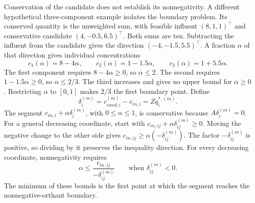 Conservation of the candidate does not establish its nonnegativity. A different hypothetical three-component example isolates the boundary problem. Its conserved quantity is the unweighted sum, with feasible influent $(8,1,1)^\top$ and conservative candidate $(4,-0.5,6.5)^\top$. Both sums are ten. Subtracting the influent from the candidate gives the direction $(-4,-1.5,5.5)^\top$. A fraction $\alpha$ of that direction gives individual concentrations
\[
c_1(\alpha)=8-4\alpha,\qquad
c_2(\alpha)=1-1.5\alpha,\qquad
c_3(\alpha)=1+5.5\alpha.
\]
The first component requires $8-4\alpha\geq0$, so $\alpha\leq2$. The second requires $1-1.5\alpha\geq0$, so $\alpha\leq2/3$. The third increases and gives no upper bound for $\alpha\geq0$. Restricting $\alpha$ to $[0,1]$ makes $2/3$ the first boundary point. Define
\begin{equation}
\delta_i^{(m)}=c_{cand,i}^{(m)}-c_{in,i}=Zq_i^{*,(m)}.
\label{eq:projection_candidate_direction}
\end{equation}
The segment $c_{in,i}+\alpha\delta_i^{(m)}$, with $0\leq\alpha\leq1$, is conservative because $A\delta_i^{(m)}=0$. For a general decreasing coordinate, start with $c_{in,ij}+\alpha\delta_{ij}^{(m)}\geq0$. Moving the negative change to the other side gives $c_{in,ij}\geq\alpha(-\delta_{ij}^{(m)})$. The factor $-\delta_{ij}^{(m)}$ is positive, so dividing by it preserves the inequality direction. For every decreasing coordinate, nonnegativity requires
\begin{equation}
\alpha\leq\frac{c_{in,ij}}{-\delta_{ij}^{(m)}}
\qquad\text{when }\delta_{ij}^{(m)}<0.
\label{eq:projection_coordinate_bound}
\end{equation}
The minimum of these bounds is the first point at which the segment reaches the nonnegative-orthant boundary.

